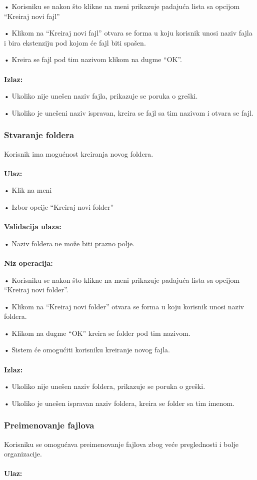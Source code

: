 \documentclass[12pt]{article}
\begin{document}
•	Korisniku se nakon što klikne na meni prikazuje padajuća lista sa opcijom “Kreiraj novi fajl” 

•	Klikom na “Kreiraj novi fajl” otvara se forma u koju korisnik unosi naziv fajla i bira ekstenziju pod kojom će fajl biti spašen. 

•	Kreira se fajl pod tim nazivom klikom na dugme “OK”. \\ \\
\textbf{Izlaz:}

•	Ukoliko nije unešen naziv fajla, prikazuje se poruka o greški. 

•	Ukoliko je unešeni naziv ispravan, kreira se fajl sa tim nazivom i otvara se fajl.


\subsubsection{Stvaranje foldera}
Korisnik ima mogućnost kreiranja novog foldera.\\ \\
\textbf{Ulaz:}

•	Klik na meni

•	Izbor opcije “Kreiraj novi folder”\\ \\
\textbf{Validacija ulaza:}

•	Naziv foldera ne može biti prazno polje.\\ \\
\textbf{Niz operacija:}

•	Korisniku se nakon što klikne na meni prikazuje padajuća lista sa opcijom “Kreiraj novi folder”.

•	Klikom na “Kreiraj novi folder” otvara se forma u koju korisnik unosi naziv foldera.

•	Klikom na dugme “OK” kreira se folder pod tim nazivom.

•	Sistem će omogućiti korisniku kreiranje novog fajla.\\ \\
\textbf{Izlaz:}

•	Ukoliko nije unešen naziv foldera, prikazuje se poruka o greški.

•	Ukoliko je unešen ispravan naziv foldera, kreira se folder sa tim imenom.

\subsubsection{Preimenovanje fajlova}
Korisniku se omogućava preimenovanje fajlova zbog veće preglednosti i bolje organizacije.\\ \\
\textbf{Ulaz:}
\end{document}

